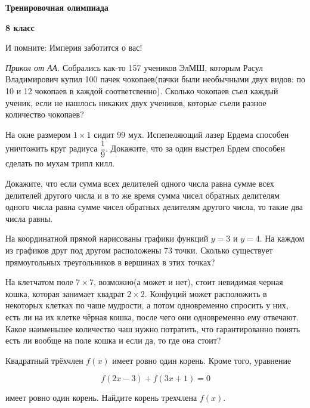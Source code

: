 \centerline{\bf \Huge Тренировочная олимпиада}
\centerline{\bf \Huge 8 класс}

\begin{flushright}
        \scriptsize{И помните: Империя заботится о вас!}
\end{flushright}

\textit{Прикол от АА.}
Собрались как-то 157 учеников ЭлМШ, которым Расул Владимирович купил 100 пачек чокопаев(пачки были необычными двух видов: по 10 и 12 чокопаев в каждой соответсвенно). Сколько чокопаев съел каждый ученик, если не нашлось никаких двух учеников, которые съели разное количество чокопаев?

На окне размером $1 \times 1$ сидит 99 мух. Испепеляющий лазер Ердема способен уничтожить круг радиуса $\dfrac{1}{9}$. Докажите, что за один выстрел Ердем способен сделать по мухам трипл килл.

Докажите, что если сумма всех делителей одного числа равна сумме всех делителей другого числа и в то же время сумма чисел обратных делителям одного числа равна сумме чисел обратных делителям другого числа, то такие два числа равны.

На координатной прямой нарисованы графики функций $y=3$ и $y=4$. На каждом из графиков друг под другом расположены 73 точки. Сколько существует прямоугольных треугольников в вершинах в этих точках?


На клетчатом поле $7\times7$, возможно(а может и нет), стоит невидимая черная кошка, которая занимает квадрат $2\times 2$. Конфуций может расположить в некоторых клетках по чаше мудрости, а потом одновременно спросить у них, есть ли на их клетке чёрная кошка, после чего они одновременно ему отвечают. Какое наименьшее количество чаш нужно потратить, что гарантированно понять есть ли вообще на поле кошка и если да, то где она стоит?

Квадратный трёхчлен $f(x)$ имеет ровно один корень. Кроме того, уравнение

$$
f(2 x-3)+f(3 x+1)=0
$$

имеет ровно один корень. Найдите корень трехчлена $f(x)$.